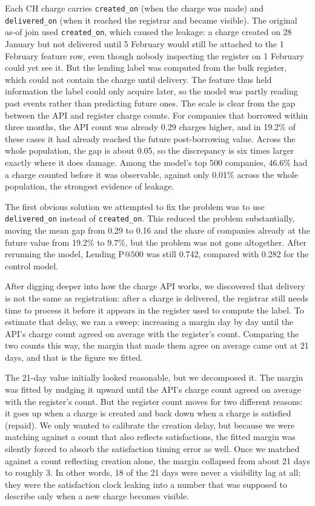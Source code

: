 \documentclass[    author={Samuel Menon Demelo; Sneha Saphala Ram Prasad; 
Viktor Ander Lindholm; Vishal Khatri},
               supervisor={Prof. Fernando Moreno-Pino},
                   degree={MSc},
                    title={Lloyds Commercial Banking Intelligence},
                 subtitle={Ranking SME Lending, Risk and Growth Prospects for Lloyds Banking Group},
                     type={},
                     year={2026}]{dissertation}
\begin{document}
Each CH charge carries \texttt{created\_on} (when the charge was made) and \texttt{delivered\_on} (when it reached the registrar and became visible). The original as-of join used \texttt{created\_on}, which caused the leakage: a charge created on 28 January but not delivered until 5 February would still be attached to the 1 February feature row, even though nobody inspecting the register on 1 February could yet see it. But the lending label was computed from the bulk register, which could not contain the charge until delivery. The feature thus held information the label could only acquire later, so the model was partly reading past events rather than predicting future ones. The scale is clear from the gap between the API and register charge counts. For companies that borrowed within three months, the API count was already 0.29 charges higher, and in 19.2\% of these cases it had already reached the future post-borrowing value. Across the whole population, the gap is about 0.05, so the discrepancy is six times larger exactly where it does damage. Among the model's top 500 companies, 46.6\% had a charge counted before it was observable, against only 0.01\% across the whole population, the strongest evidence of leakage.

The first obvious solution we attempted to fix the problem was to use \texttt{delivered\_on} instead of \texttt{created\_on}. This reduced the problem substantially, moving the mean gap from 0.29 to 0.16 and the share of companies already at the future value from 19.2\% to 9.7\%, but the problem was not gone altogether. After rerunning the model, Lending P@$500$ was still 0.742, compared with 0.282 for the control model.

After digging deeper into how the charge API works, we discovered that delivery is not the same as registration: after a charge is delivered, the registrar still needs time to process it before it appears in the register used to compute the label. To estimate that delay, we ran a sweep: increasing a margin day by day until the API's charge count agreed on average with the register's count. Comparing the two counts this way, the margin that made them agree on average came out at 21 days, and that is the figure we fitted.

The 21-day value initially looked reasonable, but we decomposed it. The margin was fitted by nudging it upward until the API's charge count agreed on average with the register's count. But the register count moves for two different reasons: it goes up when a charge is created and back down when a charge is satisfied (repaid). We only wanted to calibrate the creation delay, but because we were matching against a count that also reflects satisfactions, the fitted margin was silently forced to absorb the satisfaction timing error as well. Once we matched against a count reflecting creation alone, the margin collapsed from about 21 days to roughly 3. In other words, 18 of the 21 days were never a visibility lag at all; they were the satisfaction clock leaking into a number that was supposed to describe only when a new charge becomes visible.
\end{document}
